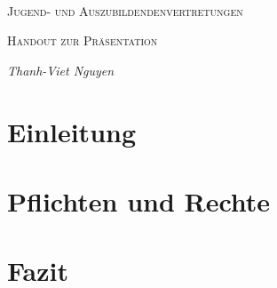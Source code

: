 \documentclass[
  a4paper,            %
  DIV=10,             %
  oneside,            %
  BCOR=5mm,           %
  parskip=half,       %
  numbers=noenddot    %
]{scrartcl}
\begin{document}
\begin{titlepage}
	\centering
	\text{}\vspace{3cm} \\
	{\scshape\LARGE Jugend- und Auszubildendenvertretungen \par}
	\vspace{0.1cm}
	{\scshape\Large 
		Handout zur Präsentation \par}
	\vspace{0.1cm}
	{\huge\bfseries \par}
	\vspace{0.1cm}
	{\Large\itshape     	
            Thanh-Viet Nguyen \\
            \par}
    \tableofcontents
\vfill
\begingroup
{}		
        \textbf {} %
\endgroup
\end{titlepage}

\clearpage


\section{Einleitung} \label{sec:intro}
    
\section{Pflichten und Rechte} 
    
%


\section{Fazit} \label{conclusion}
  
\end{document}
